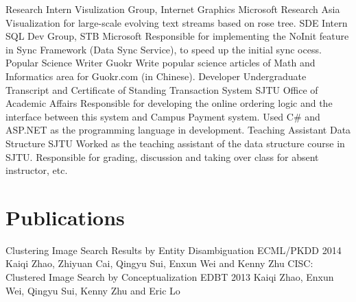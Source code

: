 \documentclass[10pt,a4paper,roman]{moderncv} %
\begin{document}
        {Research Intern}
        {Visulization Group, Internet Graphics}
        {Microsoft Research Asia}
        {}
        {Visualization for large-scale evolving text streams based on rose tree.\footnotemark[2]{}}
        {SDE Intern}
        {SQL Dev Group, STB}
        {Microsoft}
        {}
        {Responsible for implementing the NoInit feature in Sync Framework (Data Sync Service), to speed up the initial sync ocess.}
        {Popular Science Writer}
        {Guokr\footnotemark[3]{}}
        {}
        {}
        {Write popular science articles\footnotemark[4]{} of Math and Informatics area for Guokr.com (in Chinese).}
        {Developer}
        {Undergraduate Transcript and Certificate of Standing Transaction System}
        {SJTU Office of Academic Affairs}
        {}
        {Responsible for developing the online ordering logic and the interface between this system and Campus Payment system.\newline{}%
         Used C\# and ASP.NET as the programming language in development.}
        {Teaching Assistant}
        {Data Structure}
        {SJTU}
        {}
        {Worked as the teaching assistant of the data structure course in SJTU.\newline{}%
         Responsible for grading, discussion and taking over class for absent instructor\footnotemark[5]{}, etc.}

\section{Publications}
        {Clustering Image Search Results by Entity Disambiguation}
        {ECML/PKDD 2014}{}{}
        {Kaiqi Zhao, Zhiyuan Cai, Qingyu Sui, Enxun Wei and Kenny Zhu}
        {CISC: Clustered Image Search by Conceptualization}
        {EDBT 2013}{}{}
        {Kaiqi Zhao, Enxun Wei, Qingyu Sui, Kenny Zhu and Eric Lo}
\end{document}
